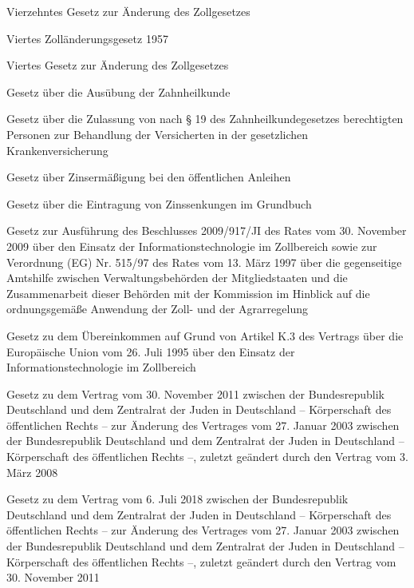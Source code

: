 \item[{ZGÄndG-14}] Vierzehntes Gesetz zur Änderung des Zollgesetzes

\item[{ZGÄndG-4-1957}] Viertes Zolländerungsgesetz 1957

\item[{ZGÄndG-4-1964}] Viertes Gesetz zur Änderung des Zollgesetzes

\item[{ZHG}] Gesetz über die Ausübung der Zahnheilkunde

\item[{ZHG-19ZG}] Gesetz über die Zulassung von nach § 19 des Zahnheilkundegesetzes berechtigten Personen zur Behandlung der Versicherten in der gesetzlichen Krankenversicherung

\item[{ZinsErmÖAnlG}] Gesetz über Zinsermäßigung bei den öffentlichen Anleihen

\item[{ZinsSenkEintrG}] Gesetz über die Eintragung von Zinssenkungen im Grundbuch

\item[{ZISAG}] Gesetz zur Ausführung des Beschlusses 2009/917/JI des Rates vom 30. November 2009 über den Einsatz der Informationstechnologie im Zollbereich sowie zur Verordnung (EG) Nr. 515/97 des Rates vom 13. März 1997 über die gegenseitige Amtshilfe zwischen Verwaltungsbehörden der Mitgliedstaaten und die Zusammenarbeit dieser Behörden mit der Kommission im Hinblick auf die ordnungsgemäße Anwendung der Zoll- und der Agrarregelung

\item[{ZISG}] Gesetz zu dem Übereinkommen auf Grund von Artikel K.3 des Vertrags über die Europäische Union vom 26. Juli 1995 über den Einsatz der Informationstechnologie im Zollbereich

\item[{ZJDVtrÄndVtr2011G}] Gesetz zu dem Vertrag vom 30. November 2011 zwischen der Bundesrepublik Deutschland und dem Zentralrat der Juden in Deutschland – Körperschaft des öffentlichen Rechts – zur Änderung des Vertrages vom 27. Januar 2003 zwischen der Bundesrepublik Deutschland und dem Zentralrat der Juden in Deutschland – Körperschaft des öffentlichen Rechts –, zuletzt geändert durch den Vertrag vom 3. März 2008

\item[{ZJDVtrÄndVtr2018G}] Gesetz zu dem Vertrag vom 6. Juli 2018 zwischen der Bundesrepublik Deutschland und dem Zentralrat der Juden in Deutschland – Körperschaft des öffentlichen Rechts – zur Änderung des Vertrages vom 27. Januar 2003 zwischen der Bundesrepublik Deutschland und dem Zentralrat der Juden in Deutschland – Körperschaft des öffentlichen Rechts –, zuletzt geändert durch den Vertrag vom 30. November 2011

